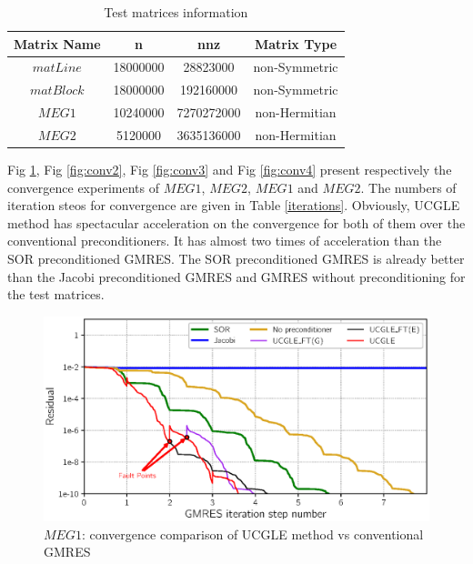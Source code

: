 \begin{table}[!t]
	\renewcommand{\arraystretch}{1.2}
	\caption{Test matrices information}
	\label{matget}
	\centering
	\begin{tabular}{|c|c|c|c|}
		\hline
		Matrix Name& n & nnz & Matrix Type\\
		\hline
		$matLine$  & \num[round-precision=2,round-mode=figures]{18000000} & \num[round-precision=2,round-mode=figures]{28823000} & non-Symmetric\\
		\hline
		$matBlock$  & \num[round-precision=2,round-mode=figures]{18000000} & \num[round-precision=2,round-mode=figures]{192160000} & non-Symmetric\\
		\hline
		$MEG1$ & \num[round-precision=4,round-mode=figures]{10240000} & \num[round-mode = places, scientific-notation = fixed, fixed-exponent = 9,round-precision = 2]{7270272000} & non-Hermitian\\
		\hline
		$MEG2$ & \num[round-precision=2,round-mode=figures]{5120000} & \num[round-mode = places, scientific-notation = fixed, fixed-exponent = 9,round-precision = 2]{3635136000} & non-Hermitian\\
		\hline
	\end{tabular}
\end{table}


Fig \ref{fig:conv1}, Fig \ref{fig:conv2}, Fig \ref{fig:conv3} and Fig \ref{fig:conv4} present respectively the convergence experiments of $MEG1$, $MEG2$, $MEG1$ and $MEG2$. The numbers of iteration steos for convergence are given in Table \ref{iterations}. Obviously, UCGLE method has spectacular acceleration on the convergence for both of them over the conventional preconditioners. It has almost two times of acceleration than the SOR preconditioned GMRES. The SOR preconditioned GMRES is already better than the Jacobi preconditioned GMRES and GMRES without preconditioning for the test matrices.

\begin{figure}[htbp]
	\centering
	\includegraphics[width=6.2in]{fig/convergence1.eps}
	\caption{$MEG1$: convergence comparison of UCGLE method vs conventional GMRES}
	\label{fig:conv1}
\end{figure}

